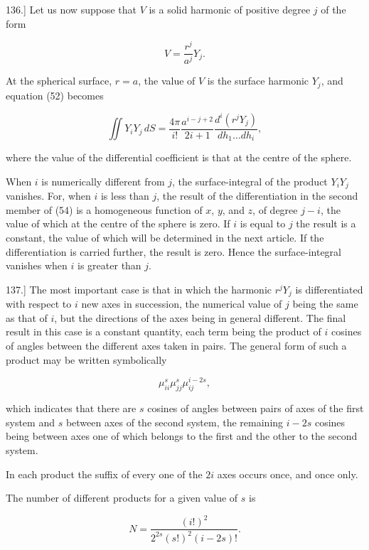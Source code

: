 \documentclass[11pt,a4paper]{article}
\begin{document}
136.] Let us now suppose that $V$ is a solid harmonic of positive degree $j$ of the form

\begin{equation}\tag{53}
V=\frac{r^j}{a^j}Y_j.
\end{equation}

At the spherical surface, $r=a$, the value of $V$ is the surface harmonic $Y_j$, and equation (52) becomes

\begin{equation}\tag{54}
\iint Y_iY_j\,dS=\frac{4\pi}{i!}\frac{a^{i-j+2}}{2i+1}
\frac{d^i(r^jY_j)}{dh_1\ldots dh_i},
\end{equation}

where the value of the differential coefficient is that at the centre of the sphere.

When $i$ is numerically different from $j$, the surface-integral of the product $Y_iY_j$ vanishes. For, when $i$ is less than $j$, the result of the differentiation in the second member of (54) is a homogeneous function of $x$, $y$, and $z$, of degree $j-i$, the value of which at the centre of the sphere is zero. If $i$ is equal to $j$ the result is a constant, the value of which will be determined in the next article. If the differentiation is carried further, the result is zero. Hence the surface-integral vanishes when $i$ is greater than $j$.

137.] The most important case is that in which the harmonic $r^jY_j$ is differentiated with respect to $i$ new axes in succession, the numerical value of $j$ being the same as that of $i$, but the directions of the axes being in general different. The final result in this case is a constant quantity, each term being the product of $i$ cosines of angles between the different axes taken in pairs. The general form of such a product may be written symbolically

\[
\mu_{ii}^{s}\mu_{jj}^{s}\mu_{ij}^{i-2s},
\]

which indicates that there are $s$ cosines of angles between pairs of axes of the first system and $s$ between axes of the second system, the remaining $i-2s$ cosines being between axes one of which belongs to the first and the other to the second system.

In each product the suffix of every one of the $2i$ axes occurs once, and once only.

The number of different products for a given value of $s$ is

\begin{equation}\tag{55}
N=\frac{(i!)^2}{2^{2s}(s!)^2(i-2s)!}.
\end{equation}
\end{document}
